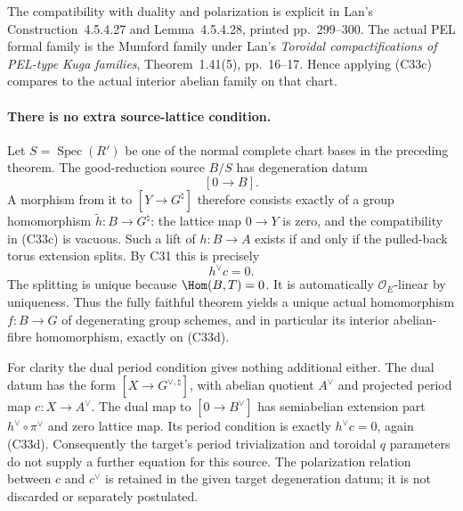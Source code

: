 \documentclass[11pt]{article}
\theoremstyle{definition}\newtheorem{definition}[theorem]{Definition}\newtheorem{remark}[theorem]{Remark}
\begin{document}
The compatibility with duality and polarization is
explicit in Lan's Construction~4.5.4.27 and
Lemma~4.5.4.28, printed pp.~299--300. The actual PEL
formal family is the Mumford family under Lan's
\emph{Toroidal compactifications of PEL-type Kuga
families}, Theorem~1.41(5), pp.~16--17. Hence applying
(C33c) compares to the actual interior abelian family
on that chart.

\paragraph{There is no extra source-lattice condition.}
Let $S=\operatorname{Spec}(R')$ be one of the normal
complete chart bases in the preceding theorem. The
good-reduction source $B/S$ has degeneration datum
\[
                         [0\longrightarrow B].
\]
A morphism from it to $[Y\longrightarrow G^{\natural}]$
therefore consists exactly of a group homomorphism
$\widetilde h:B\to G^{\natural}$: the lattice map
$0\to Y$ is zero, and the compatibility in (C33c)
is vacuous. Such a lift of $h:B\to A$ exists if
and only if the pulled-back torus extension splits.
By C31 this is precisely
\[
                              h^\vee c=0.              \tag{C33d}
\]
The splitting is unique because $\Hom(B,T)=0$.
It is automatically $\mathcal O_E$-linear by uniqueness.
Thus the fully faithful theorem yields a unique actual
homomorphism $f:B\to G$ of degenerating group schemes,
and in particular its interior abelian-fibre
homomorphism, exactly on (C33d).

For clarity the dual period condition gives nothing
additional either. The dual datum has the form
$[X\to G^{\vee,\natural}]$, with abelian quotient
$A^\vee$ and projected period map $c:X\to A^\vee$.
The dual map to $[0\to B^\vee]$ has semiabelian
extension part $h^\vee\circ\pi^\vee$ and zero lattice
map. Its period condition is exactly $h^\vee c=0$,
again (C33d). Consequently the target's period
trivialization and toroidal $q$ parameters do not
supply a further equation for this source. The
polarization relation between $c$ and $c^\vee$ is
retained in the given target degeneration datum;
it is not discarded or separately postulated.
\end{document}
